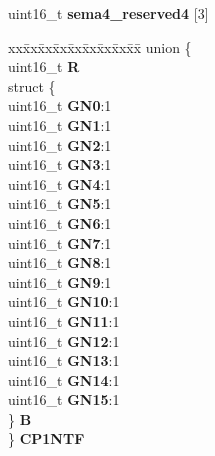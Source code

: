 \begin{DoxyCompactItemize}
\begin{tabbing}
\end{tabbing}\item 
\mbox{\label{structSEMA4__tag_a1f455fe7f7bae1ba5cb4d13a3b9ee912}} 
uint16\+\_\+t {\bfseries sema4\+\_\+reserved4} \mbox{[}3\mbox{]}
\item 
\mbox{\label{structSEMA4__tag_a0bf5a056430aef9e77e476a1f1858c9f}} 
\begin{tabbing}
xx\=xx\=xx\=xx\=xx\=xx\=xx\=xx\=xx\=\kill
union \{\\
\>uint16\_t {\bfseries R}\\
\>struct \{\\
\>\>uint16\_t {\bfseries GN0}:1\\
\>\>uint16\_t {\bfseries GN1}:1\\
\>\>uint16\_t {\bfseries GN2}:1\\
\>\>uint16\_t {\bfseries GN3}:1\\
\>\>uint16\_t {\bfseries GN4}:1\\
\>\>uint16\_t {\bfseries GN5}:1\\
\>\>uint16\_t {\bfseries GN6}:1\\
\>\>uint16\_t {\bfseries GN7}:1\\
\>\>uint16\_t {\bfseries GN8}:1\\
\>\>uint16\_t {\bfseries GN9}:1\\
\>\>uint16\_t {\bfseries GN10}:1\\
\>\>uint16\_t {\bfseries GN11}:1\\
\>\>uint16\_t {\bfseries GN12}:1\\
\>\>uint16\_t {\bfseries GN13}:1\\
\>\>uint16\_t {\bfseries GN14}:1\\
\>\>uint16\_t {\bfseries GN15}:1\\
\>\} {\bfseries B}\\
\} {\bfseries CP1NTF}\\


\end{tabbing}
\end{DoxyCompactItemize}
